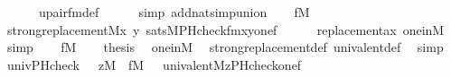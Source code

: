 \begin{isabellebody}
\ \ \ \ \ \ upair{\isacharunderscore}{\kern0pt}fm{\isacharunderscore}{\kern0pt}def\isanewline
\ \ \ \ \isamarkupfalse%
\ {\isacharparenleft}{\kern0pt}simp\ add{\isacharcolon}{\kern0pt}nat{\isacharunderscore}{\kern0pt}simp{\isacharunderscore}{\kern0pt}union{\isacharparenright}{\kern0pt}\isanewline
\ \ \isamarkupfalse%
\ {\isacartoucheopen}f{\isasymin}M{\isacartoucheclose}\isanewline
\ \ \isamarkupfalse%
\ {\isachardoublequoteopen}strong{\isacharunderscore}{\kern0pt}replacement{\isacharparenleft}{\kern0pt}{\isacharhash}{\kern0pt}{\isacharhash}{\kern0pt}M{\isacharcomma}{\kern0pt}{\isasymlambda}x\ y{\isachardot}{\kern0pt}\ sats{\isacharparenleft}{\kern0pt}M{\isacharcomma}{\kern0pt}PHcheck{\isacharunderscore}{\kern0pt}fm{\isacharparenleft}{\kern0pt}{}{\isacharcomma}{\kern0pt}{}{\isacharcomma}{\kern0pt}{}{\isacharcomma}{\kern0pt}{}{\isacharparenright}{\kern0pt}{\isacharcomma}{\kern0pt}{\isacharbrackleft}{\kern0pt}x{\isacharcomma}{\kern0pt}y{\isacharcomma}{\kern0pt}one{\isacharcomma}{\kern0pt}f{\isacharbrackright}{\kern0pt}{\isacharparenright}{\kern0pt}{\isacharparenright}{\kern0pt}{\isachardoublequoteclose}\isanewline
\ \ \ \ \isamarkupfalse%
\ replacement{\isacharunderscore}{\kern0pt}ax\ one{\isacharunderscore}{\kern0pt}in{\isacharunderscore}{\kern0pt}M\ \isamarkupfalse%
\ simp\isanewline
\ \ \isamarkupfalse%
\ {\isacartoucheopen}f{\isasymin}M{\isacartoucheclose}\isanewline
\ \ \isamarkupfalse%
\ {\isacharquery}{\kern0pt}thesis\ \isamarkupfalse%
\ one{\isacharunderscore}{\kern0pt}in{\isacharunderscore}{\kern0pt}M\ \isamarkupfalse%
\ strong{\isacharunderscore}{\kern0pt}replacement{\isacharunderscore}{\kern0pt}def\ univalent{\isacharunderscore}{\kern0pt}def\ \isamarkupfalse%
\ simp\isanewline
{}\isamarkupfalse%
%
\endisatagproof
{\isafoldproof}%
%
\isadelimproof
\isanewline
%
\endisadelimproof
\isanewline
{}\isamarkupfalse%
\ univ{\isacharunderscore}{\kern0pt}PHcheck\ {\isacharcolon}{\kern0pt}\ {\isachardoublequoteopen}{\isasymlbrakk}\ z{\isasymin}M\ {\isacharsemicolon}{\kern0pt}\ f{\isasymin}M\ {\isasymrbrakk}\ {\isasymLongrightarrow}\ univalent{\isacharparenleft}{\kern0pt}{\isacharhash}{\kern0pt}{\isacharhash}{\kern0pt}M{\isacharcomma}{\kern0pt}z{\isacharcomma}{\kern0pt}PHcheck{\isacharparenleft}{\kern0pt}one{\isacharcomma}{\kern0pt}f{\isacharparenright}{\kern0pt}{\isacharparenright}{\kern0pt}{\isachardoublequoteclose}\isanewline

\end{isabellebody}
